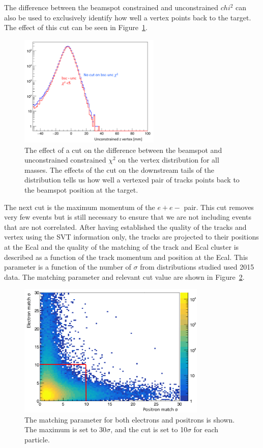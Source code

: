 The difference between the beamspot constrained and unconstrained $chi^2$ can also be used to exclusively identify how well a vertex points back to the target. The effect of this cut can be seen in Figure~\ref{fig:bmucut}.

\begin{figure}[H]
  \centering
      \includegraphics[width=0.6\textwidth]{plots/bmuchi2.png}
  \caption{The effect of a cut on the difference between the beamspot and unconstrained constrained $\chi^2$ on the vertex distribution for all masses. The effects of the cut on the downstream tails of the distribution tells us how well a vertexed pair of tracks points back to the beamspot position at the target.}
  \label{fig:bmucut}
\end{figure} 

The next cut is the maximum momentum of the $e+e-$ pair. This cut removes very few events but is still necessary to ensure that we are not including events that are not correlated. After having established the quality of the tracks and vertex using the SVT information only, the tracks are projected to their positions at the Ecal and the quality of the matching of the track and Ecal cluster is described as a function of the track momentum and position at the Ecal. This parameter is a function of the number of $\sigma$ from distributions studied used 2015 data. The matching parameter and relevant cut value are shown in Figure~\ref{fig:matchcut}. 

\begin{figure}[H]
  \centering
      \includegraphics[width=0.8\textwidth]{plots/matchcut.png}
  \caption{The matching parameter for both electrons and positrons is shown. The maximum is set to 30$\sigma$, and the cut is set to 10$\sigma$ for each particle.}
  \label{fig:matchcut}
\end{figure} 

